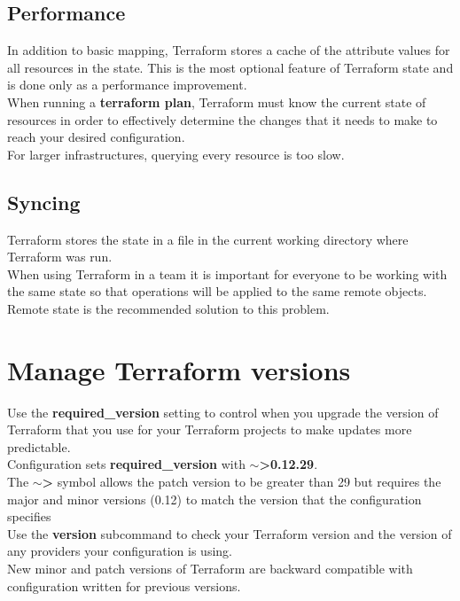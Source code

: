 \documentclass[12pt, letterpaper, twoside]{article}
\begin{document}
\subsection{Performance}
In addition to basic mapping, Terraform stores a cache of the attribute values for all 
resources in the state. This is the most optional feature of Terraform state and is 
done only as a performance improvement.\\

When running a \textbf{terraform plan}, Terraform must know the current state of resources in 
order to effectively determine the changes that it needs to make to reach your desired 
configuration.\\
For larger infrastructures, querying every resource is too slow.\\

\subsection{Syncing}
Terraform stores the state in a file in the current working directory where Terraform was run.\\
When using Terraform in a team it is important for everyone to be working with the same 
state so that operations will be applied to the same remote objects.\\
Remote state is the recommended solution to this problem.\\

\section{Manage Terraform versions}
Use the \textbf{required\_version} setting to control when you upgrade the 
version of Terraform that you use for your Terraform projects to make updates 
more predictable.\\
Configuration sets \textbf{required\_version} with \textbf{$\sim$\textgreater 0.12.29}.\\
The \textbf{$\sim$\textgreater} symbol allows the patch version to be greater than 29 but 
requires the major and minor versions (0.12) to match the version that the 
configuration specifies\\

Use the \textbf{version} subcommand to check your Terraform version and the 
version of any providers your configuration is using.\\

New minor and patch versions of Terraform are backward compatible with 
configuration written for previous versions.\\
\end{document}
